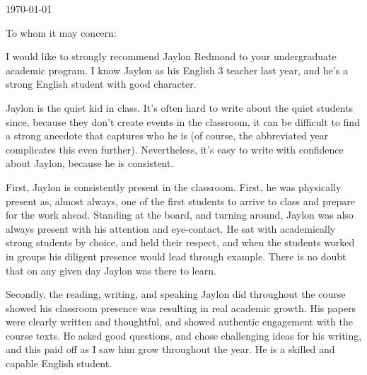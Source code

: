 \documentclass[11pt, letterpaper]{letter} %
\begin{document}

\begin{letter}{
	\today\\	
}


\opening{To whom it may concern:}

I would like to strongly recommend Jaylon Redmond to your undergraduate academic program. I know Jaylon as his English 3 teacher last year, and he's a strong English student with good character.

Jaylon is the quiet kid in class. It's often hard to write about the quiet students since, because they don't create events in the classroom, it can be difficult to find a strong anecdote that captures who he is (of course, the abbreviated year complicates this even further). Nevertheless, it's easy to write with confidence about Jaylon, because he is consistent.

First, Jaylon is consistently present in the classroom. First, he was physically present as, almost always, one of the first students to arrive to class and prepare for the work ahead. Standing at the board, and turning around, Jaylon was also always present with his attention and eye-contact. He sat with academically strong students by choice, and held their respect, and when the students worked in groups his diligent presence would lead through example. There is no doubt that on any given day Jaylon was there to learn.

Secondly, the reading, writing, and speaking Jaylon did throughout the course showed his classroom presence was resulting in real academic growth. His papers were clearly written and thoughtful, and showed authentic engagement with the course texts. He asked good questions, and chose challenging ideas for his writing, and this paid off as I saw him grow throughout the year. He is a skilled and capable English student.


\end{letter}
\end{document}
